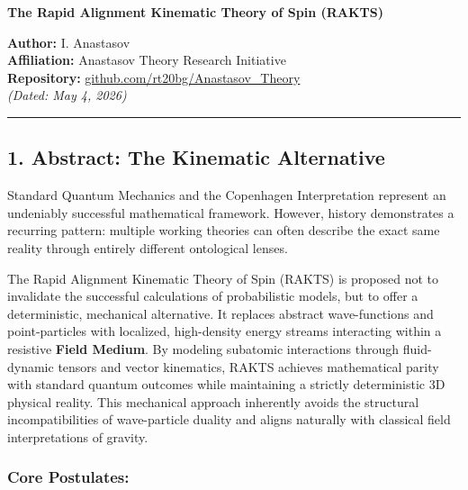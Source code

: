 \documentclass[twocolumn]{article}
\author{}
\date{}
\begin{document}
\textbf{The Rapid Alignment Kinematic Theory of Spin (RAKTS)}

\textbf{Author:} I. Anastasov\\
\textbf{Affiliation:} Anastasov Theory Research Initiative\\
\textbf{Repository:}
\href{https://github.com/rt20bg/Anastasov_Theory}{github.com/rt20bg/Anastasov\_Theory}\\
\emph{(Dated: May 4, 2026)}

\begin{center}\rule{0.5\linewidth}{0.5pt}\end{center}

\subsection{1. Abstract: The Kinematic
Alternative}\label{abstract-the-kinematic-alternative}

Standard Quantum Mechanics and the Copenhagen Interpretation represent
an undeniably successful mathematical framework. However, history
demonstrates a recurring pattern: multiple working theories can often
describe the exact same reality through entirely different ontological
lenses.

The Rapid Alignment Kinematic Theory of Spin (RAKTS) is proposed not to
invalidate the successful calculations of probabilistic models, but to
offer a deterministic, mechanical alternative. It replaces abstract
wave-functions and point-particles with localized, high-density energy
streams interacting within a resistive \textbf{Field Medium}. By
modeling subatomic interactions through fluid-dynamic tensors and vector
kinematics, RAKTS achieves mathematical parity with standard quantum
outcomes while maintaining a strictly deterministic 3D physical reality.
This mechanical approach inherently avoids the structural
incompatibilities of wave-particle duality and aligns naturally with
classical field interpretations of gravity.

\subsubsection{Core Postulates:}\label{core-postulates}
\end{document}
